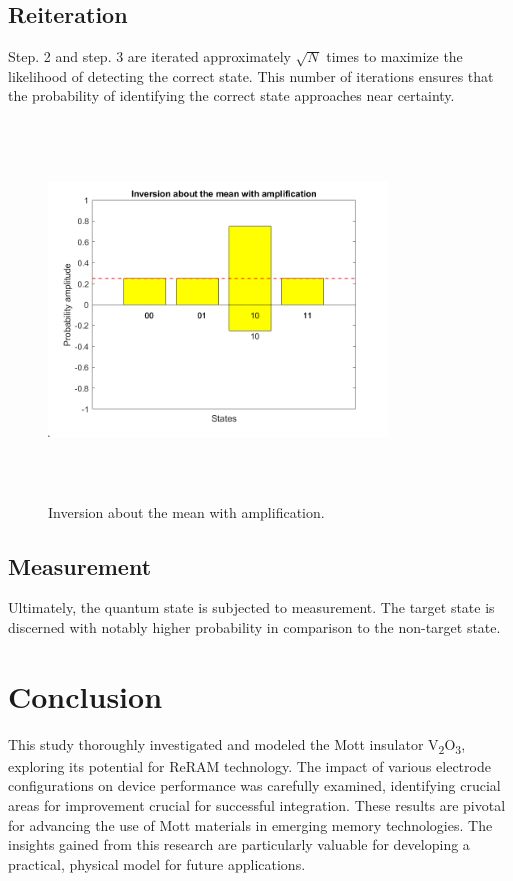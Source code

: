 \documentclass[conference]{IEEEtran}
\begin{document}
\subsection{Reiteration}
Step. 2 and step. 3 are iterated approximately $ \sqrt{N} $ times
to maximize the likelihood of detecting the correct state. This
number of iterations ensures that the probability of identifying
the correct state approaches near certainty.

\begin{figure}[htbp]
	\centerline{\includegraphics[width=9cm,height=10cm,keepaspectratio]{fig3.png}}
	\caption{Inversion about the mean with amplification.}
	\label{fig}
\end{figure}

\subsection{ Measurement}
Ultimately, the quantum state is subjected to measurement.
The target state is discerned with notably higher probability in comparison to the non-target state.

\section{Conclusion}
This study thoroughly investigated and modeled the Mott insulator V\textsubscript{2}O\textsubscript{3}, exploring its potential for ReRAM technology. The impact of various electrode configurations on device performance was carefully examined, identifying crucial areas for improvement crucial for successful integration. These results are pivotal for advancing the use of Mott materials in emerging memory technologies. The insights gained from this research are particularly valuable for developing a practical, physical model for future applications.
\end{document}

